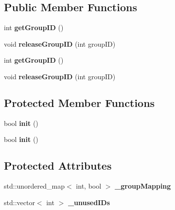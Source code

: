 \subsection*{Public Member Functions}
\begin{DoxyCompactItemize}
\item 
\mbox{\label{classGroupCommandManager_aa38224846c36ec3e3e42795f7d5bee60}} 
int {\bfseries get\+Group\+ID} ()
\item 
\mbox{\label{classGroupCommandManager_abb14f3bb0bae6856d34fd992f2cf23c4}} 
void {\bfseries release\+Group\+ID} (int group\+ID)
\item 
\mbox{\label{classGroupCommandManager_aa38224846c36ec3e3e42795f7d5bee60}} 
int {\bfseries get\+Group\+ID} ()
\item 
\mbox{\label{classGroupCommandManager_abb14f3bb0bae6856d34fd992f2cf23c4}} 
void {\bfseries release\+Group\+ID} (int group\+ID)
\end{DoxyCompactItemize}
\subsection*{Protected Member Functions}
\begin{DoxyCompactItemize}
\item 
\mbox{\label{classGroupCommandManager_a9ec3bb856d9afffe24c15916df31f8f7}} 
bool {\bfseries init} ()
\item 
\mbox{\label{classGroupCommandManager_a9ec3bb856d9afffe24c15916df31f8f7}} 
bool {\bfseries init} ()
\end{DoxyCompactItemize}
\subsection*{Protected Attributes}
\begin{DoxyCompactItemize}
\item 
\mbox{\label{classGroupCommandManager_a41044a552ade2dbbadf4f1af5ec72f59}} 
std\+::unordered\+\_\+map$<$ int, bool $>$ {\bfseries \+\_\+group\+Mapping}
\item 
\mbox{\label{classGroupCommandManager_a9ac8318db5d56302998f97168e505147}} 
std\+::vector$<$ int $>$ {\bfseries \+\_\+unused\+I\+Ds}
\end{DoxyCompactItemize}
